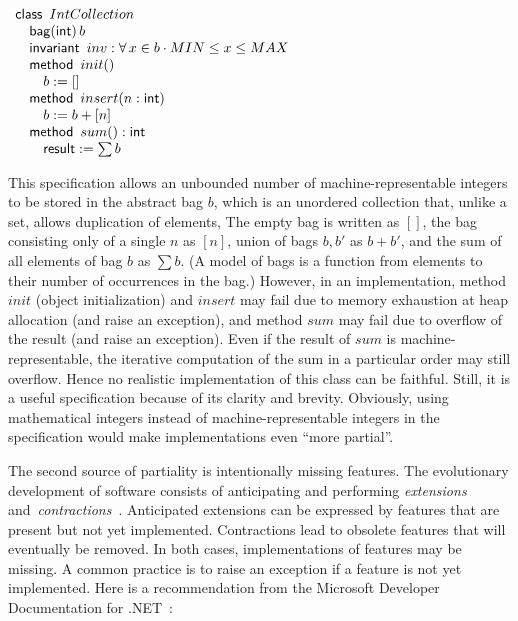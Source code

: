 \documentclass[submission,copyright,creativecommons]{eptcs}
\newcommand{\KW}[1]{\mathop{\sf #1}}
\newcommand{\RESULT}{\KW{result}}
\newcommand{\CLASS}{\KW{class}}
\newcommand{\METHOD}{\KW{method}}
\newcommand{\Int}{\KW{int}}
\newcommand{\INVARIANT}{\KW{invariant}}
\begin{document}
\begin{center}
$\begin{array}{l}
\CLASS~IntCollection\\
\quad \mathop{\sf bag}(\Int)\,b\\
\quad \INVARIANT~inv: \forall\, x \in b \cdot MIN \leq x \leq MAX \\
\quad \METHOD~init()\\
\quad \quad b := []\\
\quad \METHOD~insert(n : \Int)\\
\quad \quad b := b + [n] \\
\quad \METHOD~sum(): \Int\\
\quad \quad \RESULT := \sum b \\
\end{array}$
\end{center}
This specification allows an unbounded number of machine-representable integers to be stored in the abstract bag $b$, which is an unordered collection that, unlike a set, allows duplication of elements, The empty bag is written as $[]$, the bag consisting only of a single $n$ as $[n]$, union of bags $b, b'$ as $b + b'$, and the sum of all elements of bag $b$ as $\sum b$. (A model of bags is a function from elements to their number of occurrences in the bag.) However, in an implementation, method $init$ (object initialization) and $insert$ may fail due to memory exhaustion at heap allocation (and raise an exception), and method $sum$ may fail due to overflow of the result (and raise an exception). Even if the result of $sum$ is machine-representable, the iterative computation of the sum in a particular order may still overflow. Hence no realistic implementation of this class can be faithful. Still, it is a useful specification because of its clarity and brevity. Obviously, using mathematical integers instead of machine-representable integers in the specification would make implementations even ``more partial''.

The second source of partiality is intentionally missing features. The evolutionary development of software consists of anticipating and performing \emph{extensions} and~\emph{contractions}~\cite{Parnas78ExtensionContraction}. Anticipated extensions can be expressed by features that are present but not yet implemented. Contractions lead to obsolete features that will eventually be removed. In both cases, implementations of features may be missing. A common practice is to raise an exception if a feature is not yet implemented. Here is a recommendation from the Microsoft Developer Documentation for .NET~\cite{MS13NotImplementedException}:
\end{document}
